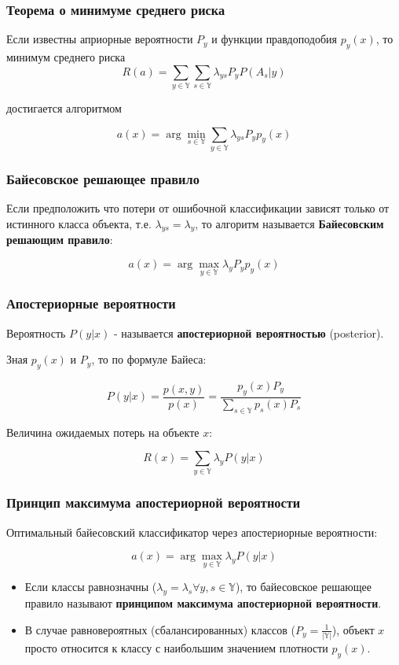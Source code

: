 \documentclass{beamer}
\begin{document}
	\begin{frame}
		\frametitle{Теорема о минимуме среднего риска}
		
		Если известны априорные вероятности $P_y$ и функции правдоподобия $p_y(x)$, то минимум среднего риска
		\[
		R(a) = \sum_{y \in \mathbb{Y}} \sum_{s \in \mathbb{Y}}
		\lambda_{ys} P_y P(A_s | y)
		\]
		
		достигается алгоритмом
		
		\[
		a(x) = \arg \min_{s \in \mathbb{Y}} \sum_{y \in \mathbb{Y}} \lambda_{ys} P_y p_y(x)
		\]
	\end{frame}
	
	\begin{frame}
		\frametitle{Байесовское решающее правило}
		Если предположить что потери от ошибочной классификации зависят только от истинного класса объекта, т.е. $\lambda_{ys} = \lambda_{y}$, то алгоритм называется \textbf{Байесовским решающим правило}:
		
		\[
		a(x) = \arg \max_{y \in \mathbb{Y}} \lambda_{y} P_y p_y(x)
		\]
	\end{frame}
	
	\begin{frame}
		\frametitle{Апостериорные вероятности}
		Вероятность $P(y | x)$ - называется \textbf{апостериорной вероятностью} (posterior).
		
		\vspace{10pt}
		
		Зная $p_y(x)$ и $P_y$, то по формуле Байеса:
		
		\[
		P(y | x) = 
		\frac{p(x, y)}{p(x)} =
		\frac{p_y(x) P_y}{\sum_{s \in \mathbb{Y}} p_s(x) P_s}
		\]
		
		\vspace{15pt}
		
		Величина ожидаемых потерь на объекте $x$:
		
		\[
		R(x) =
		\sum_{y \in \mathbb{Y}} \lambda_{y} P(y | x)
		\]
	\end{frame}
	
	\begin{frame}
		\frametitle{Принцип максимума апостериорной вероятности}
		Оптимальный байесовский классификатор через апостериорные вероятности:
		
		\[
		a(x) = \arg \max_{y \in \mathbb{Y}} \lambda_{y} P(y | x)
		\]
		
		\vspace{15pt}
		
		\begin{itemize}
		\item
		Если классы равнозначны ($\lambda_{y} = \lambda_{s} \forall y, s \in \mathbb{Y}$), то байесовское решающее правило называют \textbf{принципом максимума апостериорной вероятности}.
		
		\item
		В случае равновероятных (сбалансированных) классов ($P_y = \frac{1}{|\mathbb{Y}|}$), объект $x$ просто относится к классу с наибольшим значением плотности $p_y(x)$.
		\end{itemize}
	\end{frame}
	
\end{document}
